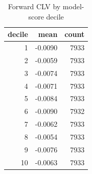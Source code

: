 \begin{table}
\caption{Forward CLV by model-score decile}
\label{tab:t4_deciles}
\begin{tabular}{rrr}
\toprule
decile & mean & count \\
\midrule
1 & -0.0090 & 7933 \\
2 & -0.0059 & 7933 \\
3 & -0.0074 & 7933 \\
4 & -0.0071 & 7933 \\
5 & -0.0084 & 7933 \\
6 & -0.0090 & 7932 \\
7 & -0.0062 & 7933 \\
8 & -0.0054 & 7933 \\
9 & -0.0076 & 7933 \\
10 & -0.0063 & 7933 \\
\bottomrule
\end{tabular}
\end{table}
